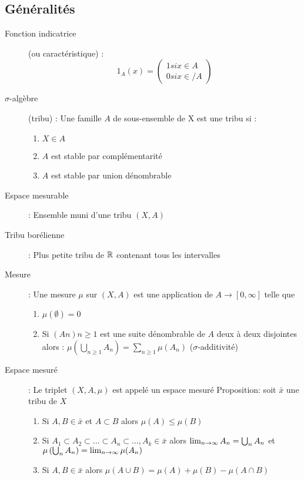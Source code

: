 \subsection{Généralités}
\begin{description}
\item[Fonction indicatrice] (ou caractéristique) : 
    \[1_A(x)=
    \begin{pmatrix}
        1 si x \in A\\
        0 si x \in
    / A
    \end{pmatrix}
    \]
\item[$\sigma$-algèbre] (tribu) : Une famille $A$ de sous-ensemble de X est une tribu si :
    \begin{enumerate}
        \item $X \in A$
        \item $A$ est stable par complémentarité
        \item $A$ est stable par union dénombrable
    \end{enumerate}
\item[Espace mesurable] : Ensemble muni d’une tribu $(X, A)$
\item[Tribu borélienne] : Plus petite tribu de $\mathbb{R}$ contenant tous les intervalles
\item[Mesure] : Une mesure $\mu$ sur $(X, A)$ est une application de $A \rightarrow [0, \infty]$ telle que
    \begin{enumerate}
        \item $\mu(\emptyset) = 0$
        \item Si $(A n ) n\ge 1$ est une suite dénombrable de $A$ deux à deux disjointes alors :
        $\mu\left(\bigcup_{n\ge 1} A_n\right) =
        \sum_{n\ge 1}\mu(A_n)$
        ($\sigma$-additivité)
    \end{enumerate}
\item[Espace mesuré] : Le triplet $(X, A, \mu)$ est appelé un espace mesuré
Proposition: soit $\bar x$ une tribu de $X$
    \begin{enumerate}
        \item Si $A, B \in \bar x$ et $A \subset B$ alors $\mu(A) \le \mu(B)$
        \item Si $A_1 \subset A_2 \subset ... \subset A_n \subset ..., A_k \in \bar x$
        alors
        $\lim_{n\rightarrow\infty}A_n = \bigcup_n A_n$ et $\mu\left(\bigcup_n A_n \right) = \lim_{n\rightarrow\infty}\mu(A_n)$
        \item Si $A, B \in \bar x$
        alors
        $\mu(A \cup B) = \mu(A) + \mu(B) - \mu(A \cap B)$

\end{enumerate}
\end{description}
